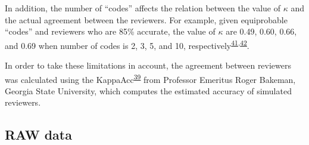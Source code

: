 \documentclass[12pt,twoside]{fmupthesis}
\begin{document}
In addition, the number of ``codes'' affects the relation between the value of \(\kappa\) and the actual
agreement between the reviewers. For example, given equiprobable ``codes'' and reviewers who are 85\%
accurate, the value of \(\kappa\) are 0.49, 0.60, 0.66, and 0.69 when number of codes is 2, 3, 5, and 10,
respectively\textsuperscript{\protect\hyperlink{ref-Bakeman1997}{41},\protect\hyperlink{ref-Morgan2019}{42}}.

In order to take these limitations in account, the agreement between reviewers was calculated using
the KappaAcc\textsuperscript{\protect\hyperlink{ref-Bakeman2011}{39}} from Professor Emeritus Roger Bakeman, Georgia State University, which
computes the estimated accuracy of simulated reviewers.

\hypertarget{raw-data}{%
\subsection{RAW data}\label{raw-data}}
\end{document}
